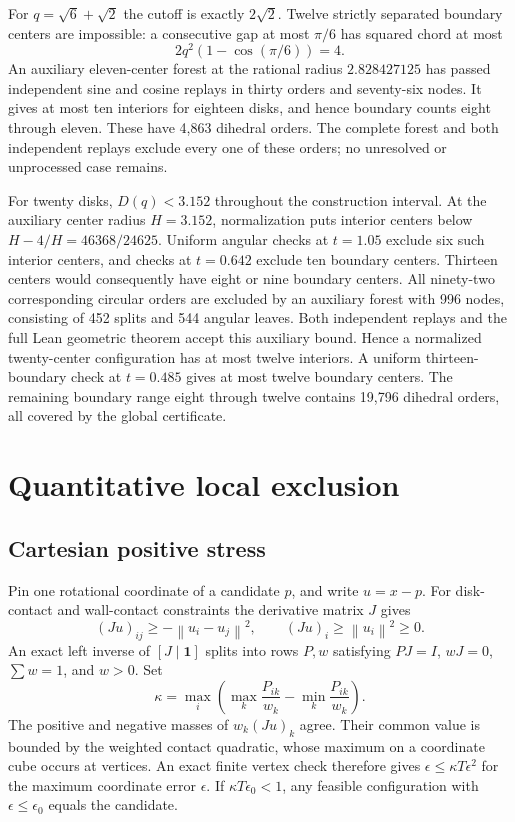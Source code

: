 \documentclass[11pt]{amsart}
\theoremstyle{definition}
\theoremstyle{remark}
\newcommand{\norm}[1]{\left\lVert #1\right\rVert}
\newcommand{\rhoHex}{\sqrt6+\sqrt2}
\begin{document}
For $q=\rhoHex$ the cutoff is exactly $2\sqrt2$. Twelve strictly separated
boundary centers are impossible: a consecutive gap at most $\pi/6$ has
squared chord at most
\[
 2q^2(1-\cos(\pi/6))=4.
\]
An auxiliary eleven-center forest at the rational radius $2.828427125$
has passed independent sine and cosine replays in thirty orders and
seventy-six nodes. It gives at most ten interiors for eighteen disks,
and hence boundary counts eight through eleven. These have 4,863 dihedral
orders. The complete forest and both independent replays exclude every one
of these orders; no unresolved or unprocessed case remains.

For twenty disks, $D(q)<3.152$ throughout the construction interval.
At the auxiliary center radius $H=3.152$, normalization puts interior
centers below $H-4/H=46368/24625$. Uniform angular checks at $t=1.05$
exclude six such interior centers, and checks at $t=0.642$ exclude ten
boundary centers. Thirteen centers would consequently have eight or nine
boundary centers. All ninety-two corresponding circular orders are
excluded by an auxiliary forest with 996 nodes, consisting of 452 splits
and 544 angular leaves. Both independent replays and the full Lean
geometric theorem accept this auxiliary bound. Hence a normalized
twenty-center configuration has at most twelve interiors. A uniform
thirteen-boundary check at $t=0.485$ gives at most twelve boundary centers.
The remaining boundary range eight through twelve contains 19,796
dihedral orders, all covered by the global certificate.

\section{Quantitative local exclusion}\label{sec:local}
\subsection{Cartesian positive stress}
Pin one rotational coordinate of a candidate $p$, and write $u=x-p$.
For disk-contact and wall-contact constraints the derivative matrix $J$
gives
\[
 (Ju)_{ij}\ge-\norm{u_i-u_j}^2,\qquad (Ju)_i\ge\norm{u_i}^2\ge0.
\]
An exact left inverse of $[J\mid\mathbf1]$ splits into rows $P,w$ satisfying
$PJ=I$, $wJ=0$, $\sum w=1$, and $w>0$. Set
\[
\kappa=\max_i\left(\max_k\frac{P_{ik}}{w_k}-
                            \min_k\frac{P_{ik}}{w_k}\right).
\]
The positive and negative masses of $w_k(Ju)_k$ agree. Their common value
is bounded by the weighted contact quadratic, whose maximum on a coordinate
cube occurs at vertices. An exact finite vertex check therefore gives
$\epsilon\le\kappa T\epsilon^2$ for the maximum coordinate error $\epsilon$.
If $\kappa T\epsilon_0<1$, any feasible configuration with
$\epsilon\le\epsilon_0$ equals the candidate.
\end{document}

